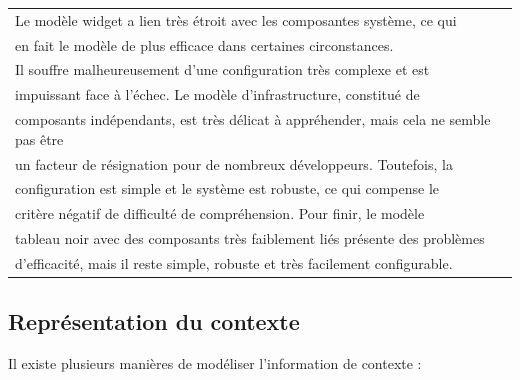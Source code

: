 {%
    \centering
    \begin{tabular}{l}
        Le modèle widget a lien très étroit avec les composantes système, ce qui
        \\ en fait le modèle de plus efficace dans certaines circonstances. \\
        Il souffre malheureusement d'une configuration très complexe et est \\
        impuissant face à l'échec. Le modèle d'infrastructure, constitué de \\
        composants indépendants, est très délicat à appréhender, mais cela ne
        semble pas être \\ un facteur de résignation pour de nombreux
        développeurs. Toutefois, la \\ configuration est simple et le système
        est robuste, ce qui compense le \\ critère négatif de difficulté de
        compréhension. Pour finir, le modèle \\ tableau noir avec des composants
        très faiblement liés présente des problèmes \\ d'efficacité, mais il
        reste simple, robuste et très facilement configurable.
        \cite{winograd_architectures_2001} \\
    \end{tabular}
}%

\subsection{Représentation du contexte}

Il existe plusieurs manières de modéliser l'information de contexte :

